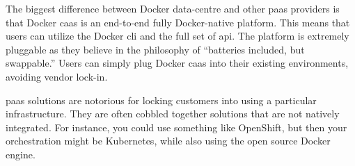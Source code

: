 The biggest difference between Docker data-centre and other \ac{paas} providers is that Docker \ac{caas}
is an end-to-end fully Docker-native platform. This means that users can utilize the Docker \ac{cli}
and the full set of \acs{api}. The platform is extremely pluggable as they believe in the philosophy of
``batteries included, but swappable.'' Users can simply plug Docker \ac{caas} into their existing
environments, avoiding vendor lock-in.

\ac{paas} solutions are notorious for locking customers into using a particular infrastructure. They
are often cobbled together solutions that are not natively integrated. For instance, you could use
something like OpenShift, but then your orchestration might be Kubernetes, while also using the open
source Docker engine.